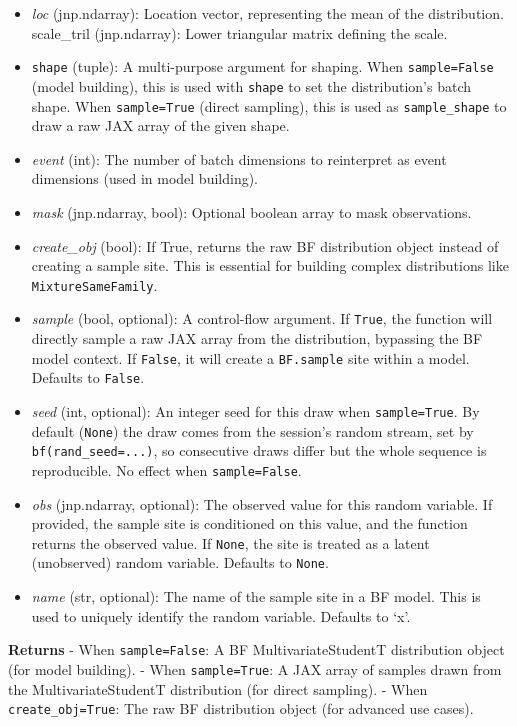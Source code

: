 \documentclass[
  letterpaper,
  DIV=11,
  numbers=noendperiod]{scrartcl}
\begin{document}
\begin{itemize}
\item
  \emph{loc} (jnp.ndarray): Location vector, representing the mean of
  the distribution. scale\_tril (jnp.ndarray): Lower triangular matrix
  defining the scale.
\item
  \texttt{shape} (tuple): A multi-purpose argument for shaping. When
  \texttt{sample=False} (model building), this is used with
  \texttt{shape} to set the distribution's batch shape. When
  \texttt{sample=True} (direct sampling), this is used as
  \texttt{sample\_shape} to draw a raw JAX array of the given shape.
\item
  \emph{event} (int): The number of batch dimensions to reinterpret as
  event dimensions (used in model building).
\item
  \emph{mask} (jnp.ndarray, bool): Optional boolean array to mask
  observations.
\item
  \emph{create\_obj} (bool): If True, returns the raw BF distribution
  object instead of creating a sample site. This is essential for
  building complex distributions like \texttt{MixtureSameFamily}.
\item
  \emph{sample} (bool, optional): A control-flow argument. If
  \texttt{True}, the function will directly sample a raw JAX array from
  the distribution, bypassing the BF model context. If \texttt{False},
  it will create a \texttt{BF.sample} site within a model. Defaults to
  \texttt{False}.
\item
  \emph{seed} (int, optional): An integer seed for this draw when
  \texttt{sample=True}. By default (\texttt{None}) the draw comes from
  the session's random stream, set by \texttt{bf(rand\_seed=...)}, so
  consecutive draws differ but the whole sequence is reproducible. No
  effect when \texttt{sample=False}.
\item
  \emph{obs} (jnp.ndarray, optional): The observed value for this random
  variable. If provided, the sample site is conditioned on this value,
  and the function returns the observed value. If \texttt{None}, the
  site is treated as a latent (unobserved) random variable. Defaults to
  \texttt{None}.
\item
  \emph{name} (str, optional): The name of the sample site in a BF
  model. This is used to uniquely identify the random variable. Defaults
  to `x'.
\end{itemize}

\textbf{Returns} - When \texttt{sample=False}: A BF MultivariateStudentT
distribution object (for model building). - When \texttt{sample=True}: A
JAX array of samples drawn from the MultivariateStudentT distribution
(for direct sampling). - When \texttt{create\_obj=True}: The raw BF
distribution object (for advanced use cases).
\end{document}
